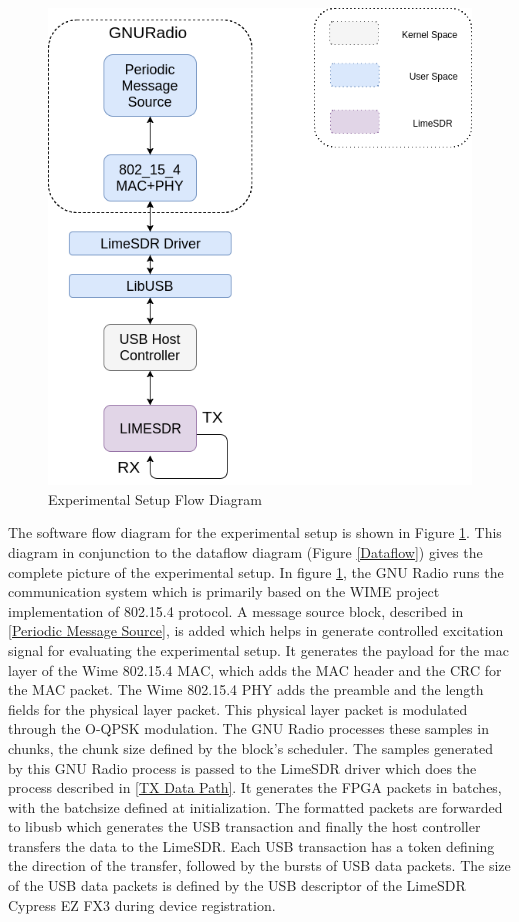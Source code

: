 \begin{figure}[h!]
\centering
\includegraphics[scale=0.6]{Thesis/Figure/Setup_Description.png}
\caption{Experimental Setup Flow Diagram}
\label{Experimental_Setup_Flow_Digram}
\end{figure}


The software flow diagram for the experimental setup is shown in Figure \ref{Experimental_Setup_Flow_Digram}.
This diagram in conjunction to the dataflow diagram (Figure \ref{Dataflow}) gives the complete picture of the experimental setup.
In figure \ref{Experimental_Setup_Flow_Digram}, the GNU Radio runs the communication system which is primarily based on the WIME project implementation of 802.15.4 protocol.
A message source block, described in \ref{Periodic Message Source}, is added which helps in generate controlled excitation signal for evaluating the experimental setup.
It generates the payload for the \ac{mac} layer of the Wime 802.15.4 MAC, which adds the MAC header and the \ac{CRC} for the MAC packet.
The Wime 802.15.4 PHY adds the preamble and the length fields for the physical layer packet.
This physical layer packet is modulated through the O-QPSK modulation.
The GNU Radio processes these samples in chunks, the chunk size defined by the block's scheduler.
The samples generated by this GNU Radio process is passed to the LimeSDR driver which does the process described in \ref{TX Data Path}.
It generates the FPGA packets in batches, with the batchsize defined at initialization.
The formatted packets are forwarded to libusb which generates the USB transaction and finally the host controller transfers the data to the LimeSDR.
Each USB transaction has a token defining the direction of the transfer, followed by the bursts of USB data packets.
The size of the USB data packets is defined by the USB descriptor of the LimeSDR Cypress EZ FX3 during device registration.

